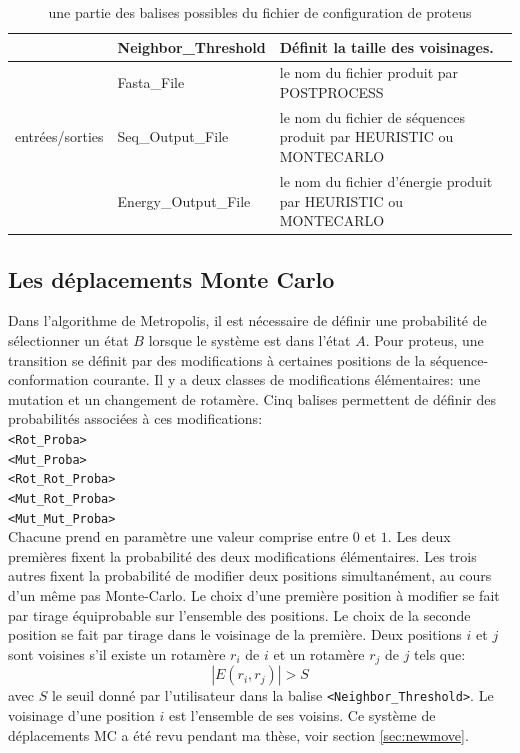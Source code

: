 \begin{table}[!htbp]
\begin{tabular}{|p{0.2\linewidth}|p{0.32\linewidth}|p{0.48\linewidth}|}
                         & Neighbor\_Threshold & Définit la taille des voisinages.\\   \hline
        
                         & Fasta\_File & le nom du fichier produit par POSTPROCESS\\    \cline{2-3}             
        entrées/sorties     & Seq\_Output\_File & le nom  du fichier de séquences produit par HEURISTIC ou MONTECARLO\\    \cline{2-3}             
                         & Energy\_Output\_File & le nom du fichier d'énergie produit par HEURISTIC ou MONTECARLO\\   \hline              

      \end{tabular} 

      \caption{une partie des balises possibles du fichier de configuration de proteus}      

      \label{tab:balise_proteus}
      

    \end{table}
    

\subsection{Les déplacements Monte Carlo}
\label{sub:MC_move}  
Dans l'algorithme de Metropolis, il est nécessaire de définir une probabilité de sélectionner un état $B$ lorsque le système est dans l'état $A$. Pour proteus, une transition se définit par des modifications à certaines positions de la séquence-conformation courante. Il y a deux classes de modifications élémentaires: une mutation et un changement de rotamère. Cinq balises permettent de définir des probabilités associées à ces modifications: \\
\verb!<Rot_Proba>! \\
\verb!<Mut_Proba>! \\
\verb!<Rot_Rot_Proba>! \\
\verb!<Mut_Rot_Proba>! \\
\verb!<Mut_Mut_Proba>!  \\
Chacune prend en paramètre une valeur comprise entre $0$ et $1$. Les deux premières fixent la probabilité des deux modifications élémentaires. Les trois autres fixent la probabilité de modifier deux positions simultanément, au cours d'un même pas Monte-Carlo. Le choix d'une première position à modifier se fait par tirage équiprobable sur l'ensemble des positions. Le choix de la seconde position se fait par tirage dans le voisinage de la première. Deux positions $i$ et $j$ sont voisines s'il existe un rotamère $r_i$ de $i$ et un rotamère $r_j$ de $j$ tels que:
\begin{displaymath}
  \label{eq:voisin}
 | E(r_i,r_j) | > S
\end{displaymath} 
avec $S$ le seuil donné par l'utilisateur dans la balise \verb!<Neighbor_Threshold>!. Le voisinage d'une position $i$ est l'ensemble de ses voisins. Ce système de déplacements MC a été revu pendant ma thèse, voir section \vref{sec:newmove}.

